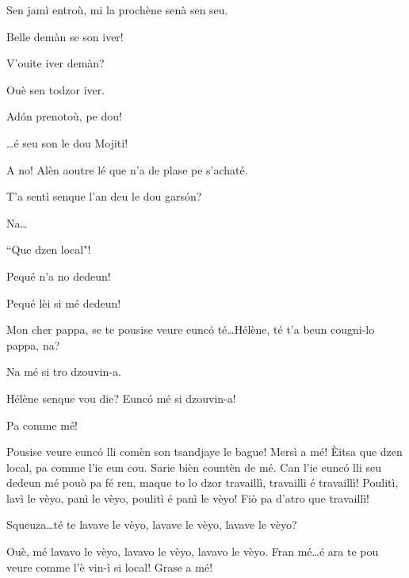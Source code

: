 \begin{drama}
\Louisspeaks Sen jamì entroù, mi la prochène senà sen seu.

\Pierrespeaks Belle demàn se son iver!

\Louisspeaks{} V'ouite iver demàn?

\Bertaspeaks Ouè sen todzor iver.

\Pierrespeaks Ad\'on prenotoù, pe dou!


\Helenespeaks \ldots é seu son le dou Mojiti!


\Pierrespeaks A no! Alèn aoutre lé que n'a de plase pe s'achaté.


\Bertaspeaks{} T'a sentì senque l'an deu le dou gars\'on?

\Helenespeaks Na\ldots

\Bertaspeaks{} ``Que dzen local"!

\Helenespeaks{} Pequé n'a no dedeun!

\Bertaspeaks{} Pequé lèi si mé dedeun!


\Bertaspeaks Mon cher pappa, se te pousise veure eunc\'o té\ldots Hélène, té t'a beun cougni-lo pappa, na?

\Helenespeaks Na mé si tro dzouvin-a.

\Bertaspeaks Hélène senque vou die? Eunc\'o mé si dzouvin-a!

\Helenespeaks Pa comme mé!

\Bertaspeaks{} Pousise veure eunc\'o lli comèn son tsandjaye le bague! Mersì a mé! \`Eitsa que dzen local, pa comme l'ie eun cou. Sarie bièn countèn de mé. Can l'ie eunc\'o lli seu dedeun mé pouò pa fé ren, maque to lo dzor travaillì, travaillì é travaillì! Poulitì, lavì le vèyo, panì le vèyo, poulitì é panì le vèyo! Fiò pa d'atro que travaillì!

\Helenespeaks{} Squeuza\ldots té te lavave le vèyo, lavave le vèyo, lavave le vèyo?

\Bertaspeaks Ouè, mé lavavo le vèyo, lavavo le vèyo, lavavo le vèyo. Fran mé\ldots é ara te pou veure comme l'è vin-ì si local! Grase a mé!


\end{drama}
